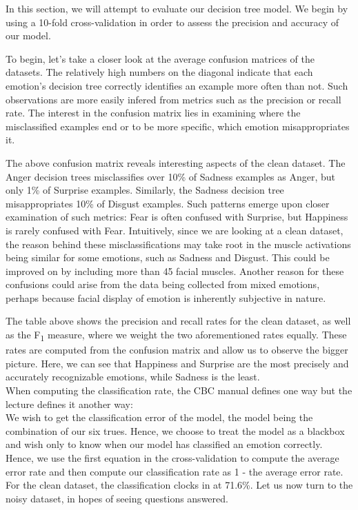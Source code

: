 In this section, we will attempt to evaluate our decision tree model. We begin by using a 10-fold cross-validation
in order to assess the precision and accuracy of our model. 

To begin, let's take a closer look at the average confusion matrices of the datasets.
The relatively high numbers on the diagonal indicate that each emotion's decision tree correctly
identifies an example more often than not. Such observations are more easily infered from metrics such as the precision or recall rate.
The interest in the confusion matrix lies in examining where the misclassified examples end or to be more specific,
which emotion misappropriates it. 



The above confusion matrix reveals interesting aspects of the clean dataset.
The Anger decision trees misclassifies over 10\% of Sadness examples as Anger, but only 1\% of Surprise examples.
Similarly, the Sadness decision tree misappropriates 10\% of Disgust examples.
Such patterns emerge upon closer examination of such metrics: Fear is often confused with Surprise, but Happiness is rarely confused with Fear.
Intuitively, since we are looking at a clean dataset,
the reason behind these misclassifications may take root in the muscle activations being similar for some emotions, such as Sadness and Disgust.
This could be improved on by including  more than 45 facial muscles.
Another reason for these confusions could arise from the data being collected from mixed emotions, perhaps because facial display
of emotion is inherently subjective in nature.



The table above shows the precision and recall rates for the clean dataset, as well as the F\textsubscript{1} measure,
where we weight the two aforementioned rates equally. These rates are computed from the confusion matrix and allow us to
observe the bigger picture. Here, we can see that Happiness and Surprise are the most precisely and accurately recognizable
emotions, while Sadness is the least. \\

When computing the classification rate, the CBC manual defines one way but the lecture defines it another way:\\


We wish to get the classification error of the model, the model being the combination of our six trues.
Hence, we choose to treat the model as a blackbox and wish only to know when our model has classified an emotion correctly.
Hence, we use the first equation in the cross-validation to compute the average error rate and then compute our classification
rate as 1 - the average error rate. For the clean dataset, the classification clocks in at 71.6\%.
Let us now turn to the noisy dataset, in hopes of seeing questions answered.

